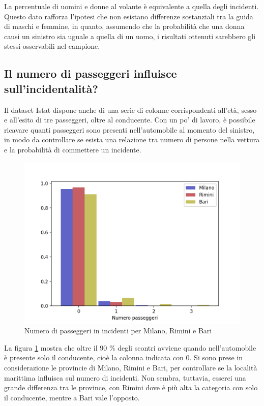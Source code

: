 \documentclass[a4paper,12pt]{report}
\begin{document}
La percentuale di uomini e donne al volante è equivalente a quella degli incidenti. 
Questo dato rafforza l'ipotesi che non esistano differenze sostanziali tra la guida di 
maschi e femmine, in quanto, assumendo che la probabilità che una donna causi un 
sinistro sia uguale a quella di un uomo, i risultati ottenuti sarebbero 
gli stessi osservabili nel campione. 

\subsection{Il numero di passeggeri influisce sull'incidentalità?}

Il dataset Istat dispone anche di una serie di colonne corrispondenti all'età, sesso e 
all'esito di tre passeggeri, oltre al conducente. 
Con un po' di lavoro, è possibile ricavare quanti passeggeri sono presenti 
nell'automobile al momento del sinistro, in modo da controllare se esista una 
relazione tra numero di persone nella vettura e la probabilità di commettere un incidente. 

\begin{figure}
    \includegraphics[width=\linewidth]{../src/incidenti/incidenti_senza_coords/passeggeri/passeggeri.png}
    \caption{Numero di passeggeri in incidenti per Milano, Rimini e Bari}
    \label{fig:passeggeri-milano-rimini}
\end{figure}

La figura \ref{fig:passeggeri-milano-rimini} mostra che oltre il $90$ \% degli scontri
avviene quando nell'automobile è presente solo il conducente, 
cioè la colonna indicata con 0. 
Si sono prese in considerazione le provincie di Milano, Rimini e Bari, 
per controllare se la località marittima influisca sul numero di incidenti. 
Non sembra, tuttavia, esserci una grande differenza tra le province, con Rimini dove è 
più alta la categoria con solo il conducente, mentre a Bari vale l'opposto. 
\end{document}
